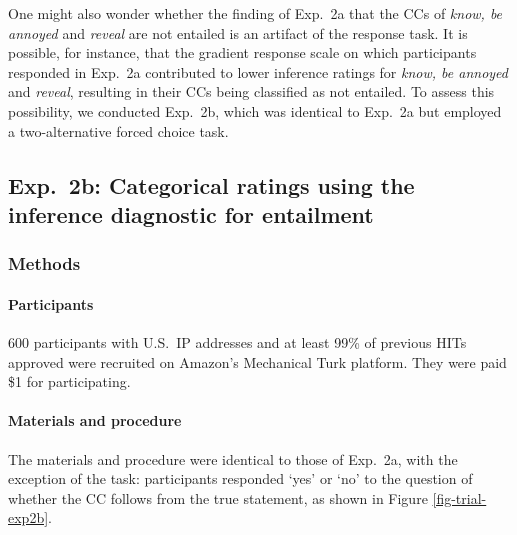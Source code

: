 \documentclass[11pt,fleqn]{article}
\newcommand{\6}{\mbox{$[\hspace*{-.6mm}[$}}
\newcommand{\9}{\mbox{$]\hspace*{-.6mm}]$}}
\begin{document}
One might also wonder whether the finding of Exp.~2a that the CCs of {\em know, be annoyed} and {\em reveal} are not entailed is an artifact of the response task. It is possible, for instance, that the gradient response scale on which participants responded in Exp.~2a contributed to lower inference ratings for {\em know, be annoyed} and {\em reveal}, resulting in their CCs being classified as not entailed. To assess this possibility, we conducted Exp.~2b, which was identical to Exp.~2a but employed a two-alternative forced choice task.

\subsection{Exp.~2b: Categorical ratings using the inference diagnostic for entailment}

\subsubsection{Methods}

\paragraph{Participants} 600 participants with U.S.\ IP addresses and at least 99\% of previous HITs approved were recruited on Amazon's Mechanical Turk platform. They were paid \$1 for participating.

\paragraph{Materials and procedure} The materials and procedure were identical to those of Exp.~2a, with the exception of the task: participants responded `yes' or `no' to the question of whether the CC follows from the true statement, as shown in Figure \ref{fig-trial-exp2b}.
\end{document}
